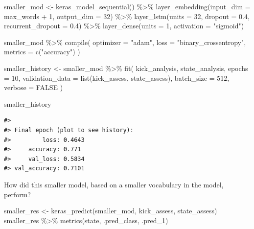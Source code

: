 \documentclass[
]{krantz}
\makeatletter
\newenvironment{Shaded}{\begin{snugshade}}{\end{snugshade}}
\newcommand{\AttributeTok}[1]{\textcolor[rgb]{0.77,0.63,0.00}{#1}}
\newcommand{\ConstantTok}[1]{\textcolor[rgb]{0.00,0.00,0.00}{#1}}
\newcommand{\DecValTok}[1]{\textcolor[rgb]{0.00,0.00,0.81}{#1}}
\newcommand{\FloatTok}[1]{\textcolor[rgb]{0.00,0.00,0.81}{#1}}
\newcommand{\FunctionTok}[1]{\textcolor[rgb]{0.00,0.00,0.00}{#1}}
\newcommand{\NormalTok}[1]{#1}
\newcommand{\OtherTok}[1]{\textcolor[rgb]{0.56,0.35,0.01}{#1}}
\newcommand{\SpecialCharTok}[1]{\textcolor[rgb]{0.00,0.00,0.00}{#1}}
\newcommand{\StringTok}[1]{\textcolor[rgb]{0.31,0.60,0.02}{#1}}
\newenvironment{kframe}{%
\medskip{}
\setlength{\fboxsep}{.8em}
 \def\at@end@of@kframe{}%
 \ifinner\ifhmode%
  \def\at@end@of@kframe{\end{minipage}}%
  \begin{minipage}{\columnwidth}%
 \fi\fi%
 \def\FrameCommand##1{\hskip\@totalleftmargin \hskip-\fboxsep
 \colorbox{shadecolor}{##1}\hskip-\fboxsep
     \hskip-\linewidth \hskip-\@totalleftmargin \hskip\columnwidth}%
 \MakeFramed {\advance\hsize-\width
   \@totalleftmargin\z@ \linewidth\hsize
   \@setminipage}}%
 {\par\unskip\endMakeFramed%
 \at@end@of@kframe}
\renewenvironment{Shaded}{\begin{kframe}}{\end{kframe}}
\makeatother
\begin{document}
\begin{Shaded}
\begin{Highlighting}[]
\NormalTok{smaller\_mod }\OtherTok{\textless{}{-}} \FunctionTok{keras\_model\_sequential}\NormalTok{() }\SpecialCharTok{\%\textgreater{}\%}
  \FunctionTok{layer\_embedding}\NormalTok{(}\AttributeTok{input\_dim =}\NormalTok{ max\_words }\SpecialCharTok{+} \DecValTok{1}\NormalTok{, }\AttributeTok{output\_dim =} \DecValTok{32}\NormalTok{) }\SpecialCharTok{\%\textgreater{}\%}
  \FunctionTok{layer\_lstm}\NormalTok{(}\AttributeTok{units =} \DecValTok{32}\NormalTok{, }\AttributeTok{dropout =} \FloatTok{0.4}\NormalTok{, }\AttributeTok{recurrent\_dropout =} \FloatTok{0.4}\NormalTok{) }\SpecialCharTok{\%\textgreater{}\%}
  \FunctionTok{layer\_dense}\NormalTok{(}\AttributeTok{units =} \DecValTok{1}\NormalTok{, }\AttributeTok{activation =} \StringTok{"sigmoid"}\NormalTok{)}

\NormalTok{smaller\_mod }\SpecialCharTok{\%\textgreater{}\%}
  \FunctionTok{compile}\NormalTok{(}
    \AttributeTok{optimizer =} \StringTok{"adam"}\NormalTok{,}
    \AttributeTok{loss =} \StringTok{"binary\_crossentropy"}\NormalTok{,}
    \AttributeTok{metrics =} \FunctionTok{c}\NormalTok{(}\StringTok{"accuracy"}\NormalTok{)}
\NormalTok{  )}

\NormalTok{smaller\_history }\OtherTok{\textless{}{-}}\NormalTok{ smaller\_mod }\SpecialCharTok{\%\textgreater{}\%}
  \FunctionTok{fit}\NormalTok{(}
\NormalTok{    kick\_analysis,}
\NormalTok{    state\_analysis,}
    \AttributeTok{epochs =} \DecValTok{10}\NormalTok{,}
    \AttributeTok{validation\_data =} \FunctionTok{list}\NormalTok{(kick\_assess, state\_assess),}
    \AttributeTok{batch\_size =} \DecValTok{512}\NormalTok{,}
    \AttributeTok{verbose =} \ConstantTok{FALSE}
\NormalTok{  )}

\NormalTok{smaller\_history}
\end{Highlighting}
\end{Shaded}

\begin{verbatim}
#> 
#> Final epoch (plot to see history):
#>         loss: 0.4643
#>     accuracy: 0.771
#>     val_loss: 0.5834
#> val_accuracy: 0.7101
\end{verbatim}

How did this smaller model, based on a smaller vocabulary in the model, perform?

\begin{Shaded}
\begin{Highlighting}[]
\NormalTok{smaller\_res }\OtherTok{\textless{}{-}} \FunctionTok{keras\_predict}\NormalTok{(smaller\_mod, kick\_assess, state\_assess)}
\NormalTok{smaller\_res }\SpecialCharTok{\%\textgreater{}\%} \FunctionTok{metrics}\NormalTok{(state, .pred\_class, .pred\_1)}
\end{Highlighting}
\end{Shaded}
\end{document}
